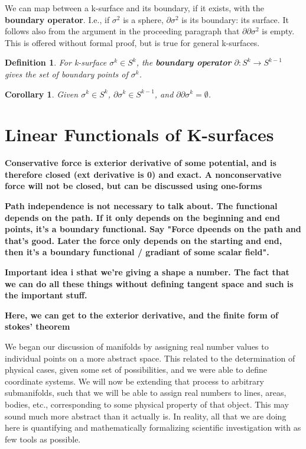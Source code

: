 \documentclass{book}
\newtheorem{defn}[equation]{Definition}
\newtheorem{coro}[equation]{Corollary}
\begin{document}
We can map between a k-surface and its boundary, if it exists, with the \textbf{boundary operator}. I.e., if $\sigma^2$ is a sphere, $\partial \sigma^2$ is its boundary: its surface. It follows also from the argument in the proceeding paragraph that $\partial\partial\sigma^2$ is empty. This is offered without formal proof, but is true for general k-surfaces. 

\begin{defn}
	For k-surface $\sigma^k \in S^k$, the \textbf{boundary operator} $\partial : S^k \to S^{k-1}$ gives the set of boundary points of $\sigma^k$. 
\end{defn}

\begin{coro}
	Given $\sigma^k \in S^k$, $\partial \sigma^k \in S^{k-1}$, and $\partial\partial \sigma^k = \emptyset$. 
\end{coro}


\section{Linear Functionals of K-surfaces}
\textbf{Conservative force is exterior derivative of some potential, and is therefore closed (ext derivative is 0) and exact. A nonconservative force will not be closed, but can be discussed using one-forms}

\textbf{Path independence is not necessary to talk about. The functional depends on the path. If it only depends on the beginning and end points, it's a boundary functional. Say "Force dpeends on the path and that's good. Later the force only depends on the starting and end, then it's a boundary functional / gradiant of some scalar field".}

\textbf{Important idea i sthat we're giving a shape a number. The fact that we can do all these things without defining tangent space and such is the important stuff.}

\textbf{Here, we can get to the exterior derivative, and the finite form of stokes' theorem}


We began our discussion of manifolds by assigning real number values to individual points on a more abstract space. This related to the determination of physical cases, given some set of possibilities, and we were able to define coordinate systems. We will now be extending that process to arbitrary submanifolds, such that we will be able to assign real numbers to lines, areas, bodies, etc., corresponding to some physical property of that object. This may sound much more abstract than it actually is. In reality, all that we are doing here is quantifying and mathematically formalizing scientific investigation with as few tools as possible. 
\end{document}
